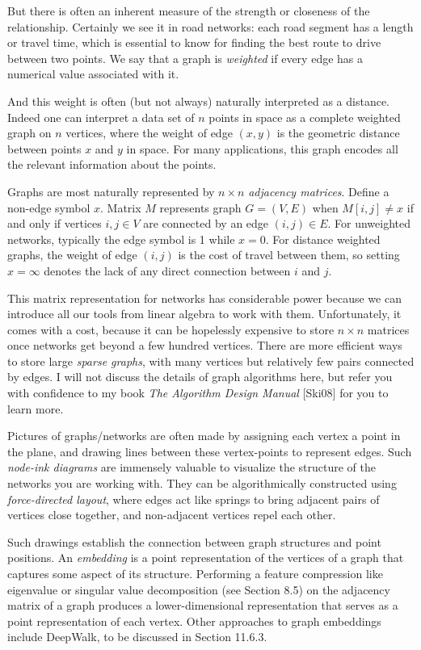 \documentclass[10pt]{article}
\begin{document}
But there is often an inherent measure of the strength or closeness of the relationship. Certainly we see it in road networks: each road segment has a length or travel time, which is essential to know for finding the best route to drive between two points. We say that a graph is \textit{weighted} if every edge has a numerical value associated with it.

And this weight is often (but not always) naturally interpreted as a distance. Indeed one can interpret a data set of $n$ points in space as a complete weighted graph on $n$ vertices, where the weight of edge $(x, y)$ is the geometric distance between points $x$ and $y$ in space. For many applications, this graph encodes all the relevant information about the points.

Graphs are most naturally represented by $n \times n$ \textit{adjacency matrices}. Define a non-edge symbol $x$. Matrix $M$ represents graph $G = (V, E)$ when $M[i, j] \neq x$ if and only if vertices $i, j \in V$ are connected by an edge $(i, j) \in E$. For unweighted networks, typically the edge symbol is 1 while $x = 0$. For distance weighted graphs, the weight of edge $(i, j)$ is the cost of travel between them, so setting $x = \infty$ denotes the lack of any direct connection between $i$ and $j$.

This matrix representation for networks has considerable power because we can introduce all our tools from linear algebra to work with them. Unfortunately, it comes with a cost, because it can be hopelessly expensive to store $n \times n$ matrices once networks get beyond a few hundred vertices. There are more efficient ways to store large \textit{sparse graphs}, with many vertices but relatively few pairs connected by edges. I will not discuss the details of graph algorithms here, but refer you with confidence to my book \textit{The Algorithm Design Manual} [Ski08] for you to learn more.

Pictures of graphs/networks are often made by assigning each vertex a point in the plane, and drawing lines between these vertex-points to represent edges. Such \textit{node-ink diagrams} are immensely valuable to visualize the structure of the networks you are working with. They can be algorithmically constructed using \textit{force-directed layout}, where edges act like springs to bring adjacent pairs of vertices close together, and non-adjacent vertices repel each other.

Such drawings establish the connection between graph structures and point positions. An \textit{embedding} is a point representation of the vertices of a graph that captures some aspect of its structure. Performing a feature compression like eigenvalue or singular value decomposition (see Section 8.5) on the adjacency matrix of a graph produces a lower-dimensional representation that serves as a point representation of each vertex. Other approaches to graph embeddings include DeepWalk, to be discussed in Section 11.6.3.
\end{document}
